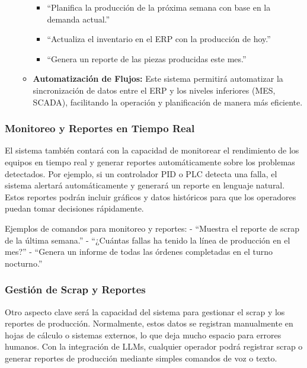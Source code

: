 \documentclass[
  10pt,
  letterpaper,
]{book}
\providecommand{\tightlist}{%
  \setlength{\itemsep}{0pt}\setlength{\parskip}{0pt}}\usepackage{longtable,booktabs,array}
\begin{document}
\begin{enumerate}
\begin{itemize}
    \begin{itemize}
    \tightlist
    \item
      ``Planifica la producción de la próxima semana con base en la
      demanda actual.''
    \item
      ``Actualiza el inventario en el ERP con la producción de hoy.''
    \item
      ``Genera un reporte de las piezas producidas este mes.''
    \end{itemize}
  \item
    \textbf{Automatización de Flujos:} Este sistema permitirá
    automatizar la sincronización de datos entre el ERP y los niveles
    inferiores (MES, SCADA), facilitando la operación y planificación de
    manera más eficiente.
  \end{itemize}
\end{enumerate}

\subsubsection{Monitoreo y Reportes en Tiempo
Real}\label{monitoreo-y-reportes-en-tiempo-real}

El sistema también contará con la capacidad de monitorear el rendimiento
de los equipos en tiempo real y generar reportes automáticamente sobre
los problemas detectados. Por ejemplo, si un controlador PID o PLC
detecta una falla, el sistema alertará automáticamente y generará un
reporte en lenguaje natural. Estos reportes podrán incluir gráficos y
datos históricos para que los operadores puedan tomar decisiones
rápidamente.

Ejemplos de comandos para monitoreo y reportes: - ``Muestra el reporte
de scrap de la última semana.'' - ``¿Cuántas fallas ha tenido la línea
de producción en el mes?'' - ``Genera un informe de todas las órdenes
completadas en el turno nocturno.''

\subsubsection{Gestión de Scrap y
Reportes}\label{gestiuxf3n-de-scrap-y-reportes}

Otro aspecto clave será la capacidad del sistema para gestionar el scrap
y los reportes de producción. Normalmente, estos datos se registran
manualmente en hojas de cálculo o sistemas externos, lo que deja mucho
espacio para errores humanos. Con la integración de LLMs, cualquier
operador podrá registrar scrap o generar reportes de producción mediante
simples comandos de voz o texto.
\end{document}
